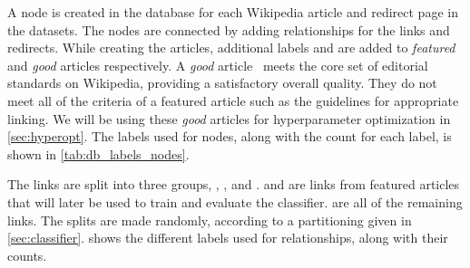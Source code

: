 A node is created in the database for each Wikipedia article and redirect page in the datasets. The nodes are connected by adding relationships for the links and redirects. While creating the articles, additional labels  and  are added to \emph{featured} and \emph{good} articles respectively. A \emph{good} article~\cite{wiki-good-articles} meets the core set of editorial standards on Wikipedia, providing a satisfactory overall quality. They do not meet all of the criteria of a featured article such as the guidelines for appropriate linking. We will be using these \emph{good} articles for hyperparameter optimization in \cref{sec:hyperopt}. The labels used for nodes, along with the count for each label, is shown in \cref{tab:db_labels_nodes}.

The links are split into three groups, , , and .  and  are links from featured articles that will later be used to train and evaluate the classifier.  are all of the remaining links. The splits are made randomly, according to a partitioning given in \cref{sec:classifier}.  shows the different labels used for relationships, along with their counts.


